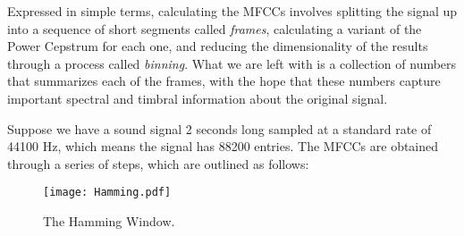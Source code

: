 Expressed in simple terms, calculating the MFCCs involves splitting the signal up into a sequence of
short segments called \emph{frames}, calculating a variant of the Power Cepstrum for each one,
and reducing the dimensionality of the results through a process called \emph{binning}. What we are
left with is a collection of numbers that summarizes each of the frames, with the hope that these
numbers capture important spectral and timbral information about the original signal.

Suppose we have a sound signal 2 seconds long sampled at a standard rate of 44100 Hz, which means the
signal has 88200 entries. The  MFCCs are obtained through a series of steps, which are outlined
as follows:
\begin{figure}
\centering
\texttt{[image: Hamming.pdf]}
\caption{The Hamming Window.}
\label{fourierext:ham}
\end{figure}
